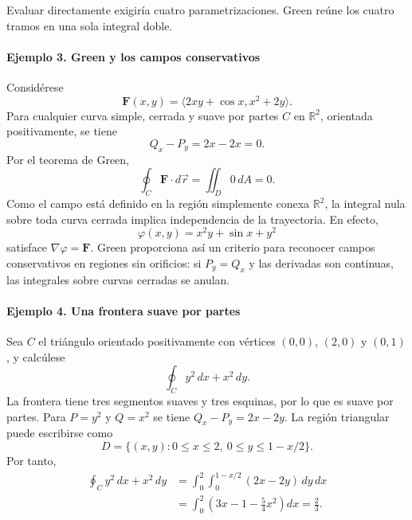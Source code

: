 \begingroup
\shorthandoff{>}
\begin{center}
\end{center}
\endgroup

Evaluar directamente exigiría cuatro parametrizaciones. Green reúne los cuatro tramos en una sola integral doble.

\paragraph{Ejemplo 3. Green y los campos conservativos}
Considérese
\[
\mathbf{F}(x,y)=\langle2xy+\cos x,x^2+2y\rangle.
\]
Para cualquier curva simple, cerrada y suave por partes $C$ en $\mathbb R^2$, orientada positivamente, se tiene
\[
Q_x-P_y=2x-2x=0.
\]
Por el teorema de Green,
\[
\oint_C\mathbf{F}\cdot d\vec r=\iint_D0\,dA=0.
\]
Como el campo está definido en la región simplemente conexa $\mathbb R^2$, la integral nula sobre toda curva cerrada implica independencia de la trayectoria. En efecto,
\[
\varphi(x,y)=x^2y+\sin x+y^2
\]
satisface $\nabla\varphi=\mathbf{F}$. Green proporciona así un criterio para reconocer campos conservativos en regiones sin orificios: si $P_y=Q_x$ y las derivadas son continuas, las integrales sobre curvas cerradas se anulan.

\paragraph{Ejemplo 4. Una frontera suave por partes}
Sea $C$ el triángulo orientado positivamente con vértices $(0,0)$, $(2,0)$ y $(0,1)$, y calcúlese
\[
\oint_C y^2\,dx+x^2\,dy.
\]
La frontera tiene tres segmentos suaves y tres esquinas, por lo que es suave por partes. Para $P=y^2$ y $Q=x^2$ se tiene $Q_x-P_y=2x-2y$. La región triangular puede escribirse como
\[
D=\{(x,y):0\leq x\leq2,\ 0\leq y\leq1-x/2\}.
\]
Por tanto,
\begin{align*}
\oint_C y^2\,dx+x^2\,dy
&=\int_0^2\int_0^{1-x/2}(2x-2y)\,dy\,dx\\
&=\int_0^2\left(3x-1-\frac54x^2\right)dx
=\frac23.
\end{align*}

